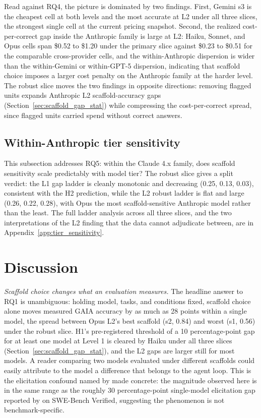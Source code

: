 \documentclass[10pt]{article} %
\begin{document}
        Read against RQ4, the picture is dominated by two findings. First, Gemini s3 is the cheapest cell at both levels and the most accurate at L2 under all three slices, the strongest single cell at the current pricing snapshot. Second, the realized cost-per-correct gap inside the Anthropic family is large at L2: Haiku, Sonnet, and Opus cells span \$0.52 to \$1.20 under the primary slice against \$0.23 to \$0.51 for the comparable cross-provider cells, and the within-Anthropic dispersion is wider than the within-Gemini or within-GPT-5 dispersion, indicating that scaffold choice imposes a larger cost penalty on the Anthropic family at the harder level. The robust slice moves the two findings in opposite directions: removing flagged units expands Anthropic L2 scaffold-accuracy gaps (Section~\ref{sec:scaffold_gap_stat}) while compressing the cost-per-correct spread, since flagged units carried spend without correct answers.

    \subsection{Within-Anthropic tier sensitivity}\label{sec:tier_sensitivity}

        This subsection addresses RQ5: within the Claude 4.x family, does scaffold sensitivity scale predictably with model tier? The robust slice gives a split verdict: the L1 gap ladder is cleanly monotonic and decreasing (0.25, 0.13, 0.03), consistent with the H2 prediction, while the L2 robust ladder is flat and large (0.26, 0.22, 0.28), with Opus the most scaffold-sensitive Anthropic model rather than the least. The full ladder analysis across all three slices, and the two interpretations of the L2 finding that the data cannot adjudicate between, are in Appendix~\ref{app:tier_sensitivity}.

\section{Discussion}

    \textit{Scaffold choice changes what an evaluation measures.} The headline answer to RQ1 is unambiguous: holding model, tasks, and conditions fixed, scaffold choice alone moves measured GAIA accuracy by as much as 28 points within a single model, the spread between Opus L2's best scaffold (s2, 0.84) and worst (s1, 0.56) under the robust slice. H1's pre-registered threshold of a 10 percentage-point gap for at least one model at Level 1 is cleared by Haiku under all three slices (Section~\ref{sec:scaffold_gap_stat}), and the L2 gaps are larger still for most models. A reader comparing two models evaluated under different scaffolds could easily attribute to the model a difference that belongs to the agent loop. This is the elicitation confound named by \citet{kwa2026measuring} made concrete: the magnitude observed here is in the same range as the roughly 30 percentage-point single-model elicitation gap reported by \citet{pimpale2025} on SWE-Bench Verified, suggesting the phenomenon is not benchmark-specific.
\end{document}
